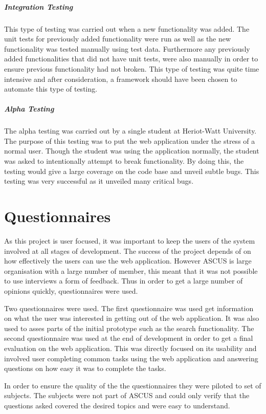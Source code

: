 \documentclass[a4paper,oneside,11pt]{report}
\begin{document}
\subparagraph{Integration Testing}
This type of testing was carried out when a new functionality was added. The unit tests for previously added functionality were run as well as the new functionality was tested manually using test data. Furthermore any previously added functionalities that did not have unit tests, were also manually in order to ensure previous functionality had not broken. This type of testing was quite time intensive and after consideration, a framework should have been chosen to automate this type of testing.

\subparagraph{Alpha Testing}
The alpha testing was carried out by a single student at Heriot-Watt University. The purpose of this testing was to put the web application under the stress of a normal user. Though the student was using the application normally, the student was asked to intentionally attempt to break functionality. By doing this, the testing would give a large coverage on the code base and unveil subtle bugs. This testing was very successful as it unveiled many critical bugs.
\pagebreak
\section{Questionnaires}
As this project is user focused, it was important to keep the users of the system involved at all stages of development. The success of the project depends of on how effectively the users can use the web application. However ASCUS is large organisation with a large number of member, this meant that it was not possible to use interviews a form of feedback. Thus in order to get a large number of opinions quickly, questionnaires were used.

Two questionnaires were used. The first questionnaire was used get information on what the user was interested in getting out of the web application. It was also used to asses parts of the initial prototype such as the search functionality. The second questionnaire was used at the end of development in order to get a final evaluation on the web application. This was directly focused on its usability and involved user completing common tasks using the web application and answering questions on how easy it was to complete the tasks.

In order to ensure the quality of the the questionnaires they were piloted to set of subjects. The subjects were not part of ASCUS and could only verify that the questions asked covered the desired topics and were easy to understand.
\end{document}
